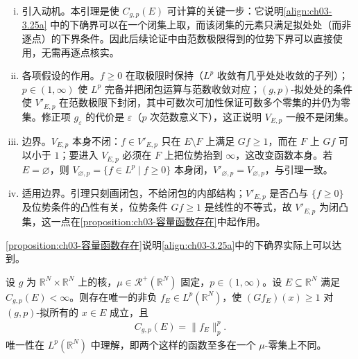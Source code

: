 \documentclass[../../main.tex]{subfiles}%
\begin{document}
\begin{remark}\label{remark:ch03-容许集闭包}
\begin{enumerate}[(i)]
\item 引入动机。本引理是使 $C_{g,p}(E)$ 可计算的关键一步：它说明\eqref{align:ch03-3.25a} 中的下确界可以在一个闭集上取，而该闭集的元素只满足拟处处（而非逐点）的下界条件。因此后续论证中由范数极限得到的位势下界可以直接使用，无需再逐点核实。

\item 各项假设的作用。$f\geqslant0$ 在取极限时保持（$L^p$ 收敛有几乎处处收敛的子列）；$p\in(1,\infty)$ 使 $L^p$ 完备并把闭包运算与范数收敛对应；$(g,p)$-拟处处的条件使 $V'_{E,p}$ 在范数极限下封闭，其中可数次可加性保证可数多个零集的并仍为零集。修正项 $g_\varepsilon$ 的代价是 $\varepsilon$（$p$ 次范数意义下），这正说明 $V_{E,p}$ 一般不是闭集。

\item 边界。$V_{E,p}$ 本身不闭：$f\in V'_{E,p}$ 只在 $E\setminus F$ 上满足 $Gf\geqslant1$，而在 $F$ 上 $Gf$ 可以小于 $1$；要进入 $V_{E,p}$ 必须在 $F$ 上把位势抬到 $\infty$，这改变函数本身。若 $E=\varnothing$，则 $V_{\varnothing,p}=\{f\in L^p\mid f\geqslant0\}$ 本身闭，$V'_{\varnothing,p}=V_{\varnothing,p}$，与引理一致。

\item 适用边界。引理只刻画闭包，不给闭包的内部结构；$V'_{E,p}$ 是否凸与 $\{f\geqslant0\}$ 及位势条件的凸性有关，位势条件 $Gf\geqslant1$ 是线性的不等式，故 $V'_{E,p}$ 为闭凸集，这一点在\cref{proposition:ch03-容量函数存在}中起作用。
\end{enumerate}
\end{remark}

\cref{proposition:ch03-容量函数存在}说明\eqref{align:ch03-3.25a}中的下确界实际上可以达到。

\begin{proposition}\label{proposition:ch03-容量函数存在}
设 $g$ 为 $\mathbb{R}^N\times\mathbb{R}^N$ 上的核，$\mu\in\mathscr{R}^+(\mathbb{R}^N)$ 固定，$p\in(1,\infty)$。设 $E\subseteq\mathbb{R}^N$ 满足 $C_{g,p}(E)<\infty$。则存在唯一的非负 $f_E\in L^p(\mathbb{R}^N)$，使 $(Gf_E)(x)\geqslant1$ 对 $(g,p)$-拟所有的 $x\in E$ 成立，且
\begin{align*}
C_{g,p}(E)=\|f_E\|_p^p .
\end{align*}
唯一性在 $L^p(\mathbb{R}^N)$ 中理解，即两个这样的函数至多在一个 $\mu$-零集上不同。
\end{proposition}
\end{document}
